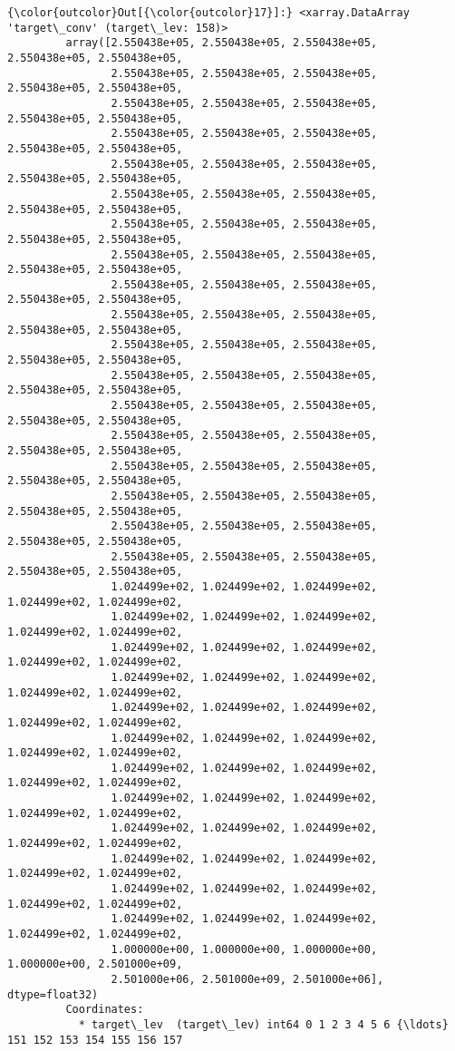 \documentclass[11pt]{article}
\begin{document}
\begin{Verbatim}[commandchars=\\\{\}]
{\color{outcolor}Out[{\color{outcolor}17}]:} <xarray.DataArray 'target\_conv' (target\_lev: 158)>
         array([2.550438e+05, 2.550438e+05, 2.550438e+05, 2.550438e+05, 2.550438e+05,
                2.550438e+05, 2.550438e+05, 2.550438e+05, 2.550438e+05, 2.550438e+05,
                2.550438e+05, 2.550438e+05, 2.550438e+05, 2.550438e+05, 2.550438e+05,
                2.550438e+05, 2.550438e+05, 2.550438e+05, 2.550438e+05, 2.550438e+05,
                2.550438e+05, 2.550438e+05, 2.550438e+05, 2.550438e+05, 2.550438e+05,
                2.550438e+05, 2.550438e+05, 2.550438e+05, 2.550438e+05, 2.550438e+05,
                2.550438e+05, 2.550438e+05, 2.550438e+05, 2.550438e+05, 2.550438e+05,
                2.550438e+05, 2.550438e+05, 2.550438e+05, 2.550438e+05, 2.550438e+05,
                2.550438e+05, 2.550438e+05, 2.550438e+05, 2.550438e+05, 2.550438e+05,
                2.550438e+05, 2.550438e+05, 2.550438e+05, 2.550438e+05, 2.550438e+05,
                2.550438e+05, 2.550438e+05, 2.550438e+05, 2.550438e+05, 2.550438e+05,
                2.550438e+05, 2.550438e+05, 2.550438e+05, 2.550438e+05, 2.550438e+05,
                2.550438e+05, 2.550438e+05, 2.550438e+05, 2.550438e+05, 2.550438e+05,
                2.550438e+05, 2.550438e+05, 2.550438e+05, 2.550438e+05, 2.550438e+05,
                2.550438e+05, 2.550438e+05, 2.550438e+05, 2.550438e+05, 2.550438e+05,
                2.550438e+05, 2.550438e+05, 2.550438e+05, 2.550438e+05, 2.550438e+05,
                2.550438e+05, 2.550438e+05, 2.550438e+05, 2.550438e+05, 2.550438e+05,
                2.550438e+05, 2.550438e+05, 2.550438e+05, 2.550438e+05, 2.550438e+05,
                1.024499e+02, 1.024499e+02, 1.024499e+02, 1.024499e+02, 1.024499e+02,
                1.024499e+02, 1.024499e+02, 1.024499e+02, 1.024499e+02, 1.024499e+02,
                1.024499e+02, 1.024499e+02, 1.024499e+02, 1.024499e+02, 1.024499e+02,
                1.024499e+02, 1.024499e+02, 1.024499e+02, 1.024499e+02, 1.024499e+02,
                1.024499e+02, 1.024499e+02, 1.024499e+02, 1.024499e+02, 1.024499e+02,
                1.024499e+02, 1.024499e+02, 1.024499e+02, 1.024499e+02, 1.024499e+02,
                1.024499e+02, 1.024499e+02, 1.024499e+02, 1.024499e+02, 1.024499e+02,
                1.024499e+02, 1.024499e+02, 1.024499e+02, 1.024499e+02, 1.024499e+02,
                1.024499e+02, 1.024499e+02, 1.024499e+02, 1.024499e+02, 1.024499e+02,
                1.024499e+02, 1.024499e+02, 1.024499e+02, 1.024499e+02, 1.024499e+02,
                1.024499e+02, 1.024499e+02, 1.024499e+02, 1.024499e+02, 1.024499e+02,
                1.024499e+02, 1.024499e+02, 1.024499e+02, 1.024499e+02, 1.024499e+02,
                1.000000e+00, 1.000000e+00, 1.000000e+00, 1.000000e+00, 2.501000e+09,
                2.501000e+06, 2.501000e+09, 2.501000e+06], dtype=float32)
         Coordinates:
           * target\_lev  (target\_lev) int64 0 1 2 3 4 5 6 {\ldots} 151 152 153 154 155 156 157
\end{Verbatim}
            
\end{document}
